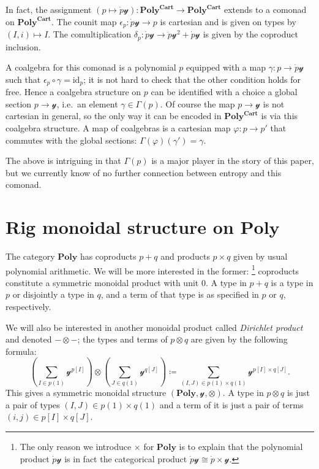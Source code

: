 \documentclass[11pt, one side, article]{memoir}
\theoremstyle{definition}
\theoremstyle{plain}
\newenvironment{remark}
  {\pushQED{\qed}\renewcommand{\qedsymbol}{$\lozenge$}\remarkx}
  {\popQED\endremarkx}
\newcommand{\Cat}[1]{\mathbf{#1}}%
\newcommand{\id}{\mathrm{id}}
\newcommand{\yon}{\mathcal{y}}
\newcommand{\poly}{\Cat{Poly}}
\newcommand{\polycart}{\poly^{\Cat{Cart}}}
\newcommand{\0}{\textsf{0}}
\newcommand{\1}{\tn{\textsf{1}}}
\begin{document}
\begin{remark}\label{rem.comonad}
In fact, the assignment $(p\mapsto\dot{p}\yon)\colon\polycart\to\polycart$ extends to a comonad on $\polycart$. The counit map $\epsilon_p\colon\dot{p}\yon\to p$ is cartesian and is given on types by $(I,i)\mapsto I$. The comultiplication $\delta_p\colon\dot{p}\yon\to\ddot{p}\yon^2+\dot{p}\yon$ is given by the coproduct inclusion.

A coalgebra for this comonad is a polynomial $p$ equipped with a map $\gamma\colon p\to\dot{p}\yon$ such that $\epsilon_p\circ\gamma=\id_p$; it is not hard to check that the other condition holds for free. Hence a coalgebra structure on $p$ can be identified with a choice a global section $p\to\yon$, i.e.\ an element $\gamma\in\Gamma(p)$. Of course the map $p\to\yon$ is not cartesian in general, so the only way it can be encoded in $\polycart$ is via this coalgebra structure. A map of coalgebras is a cartesian map $\varphi\colon p\to p'$ that commutes with the global sections: $\Gamma(\varphi)(\gamma')=\gamma$.

The above is intriguing in that $\Gamma(p)$ is a major player in the story of this paper, but we currently know of no further connection between entropy and this comonad. 
\end{remark}

\section{Rig monoidal structure on $\poly$}\label{sec.rig}

The category $\poly$ has coproducts $p+q$ and products $p\times q$ given by usual polynomial arithmetic. We will be more interested in the former:%
\footnote{
The only reason we introduce $\times$ for $\poly$ is to explain that the polynomial product $\dot{p}\yon$ is in fact the categorical product $\dot{p}\yon\cong\dot{p}\times\yon$.
}
coproducts constitute a symmetric monoidal product with unit $0$. A type in $p+q$ is a type in $p$ or disjointly a type in $q$, and a term of that type is as specified in $p$ or $q$, respectively.

We will also be interested in another monoidal product called \emph{Dirichlet product} and denoted $-\otimes-$; the types and terms of $p\otimes q$ are given by the following formula:
\begin{equation}\label{eqn.dir_formula}
  \left(\sum_{I\in p(1)}\yon^{p[I]}\right)\otimes
  \left(\sum_{J\in q(1)}\yon^{q[J]}\right)\coloneqq
  \sum_{(I,J)\in p(1)\times q(1)}\yon^{p[I]\times q[J]}.
\end{equation}
This gives a symmetric monoidal structure $(\poly,\yon,\otimes)$. A type in $p\otimes q$ is just a pair of types $(I,J)\in p(1)\times q(1)$ and a term of it is just a pair of terms $(i,j)\in p[I]\times q[J]$.
\end{document}
